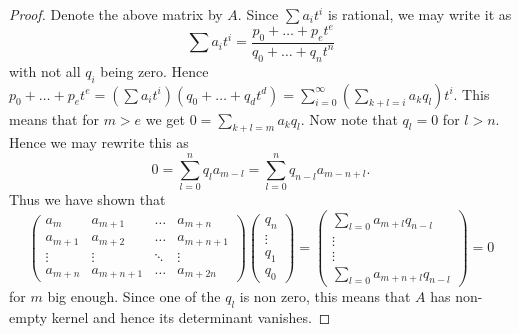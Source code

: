 \documentclass[11pt, a4paper, english, twoside]{article}
\theoremstyle{plain}
\theoremstyle{definition}
\begin{document}
\begin{proof}
    Denote the above matrix by $A$. Since $\sum a_it^i$ is rational, we may write it as
    \[
        \sum a_it^i = \frac{p_0 + \dots + p_et^e}{q_0 + \dots + q_n t^n}
    \]
    with not all $q_i$ being zero.
    Hence 
    $p_0 + \dots + p_et^e = \left(\sum a_it^i\right)\left(q_0 + \dots + q_d t^d\right) = \sum_{i=0}^{\infty} \left(\sum_{k+l=i} a_kq_l\right)t^i$.
    This means that for $m > e$ we get $0 = \sum_{k+l=m} a_kq_l$. Now note that $q_l = 0$ for $l > n$. Hence we may rewrite this as
    \[
        0 = \sum_{l = 0}^{n} q_la_{m-l} = \sum_{l=0}^n q_{n-l}a_{m-n+l}.
    \]
    Thus we have shown that
    \[
        \begin{pmatrix}
            a_m     & a_{m+1} & \dots & a_{m+n} \\
            a_{m+1} & a_{m+2} & \dots & a_{m+n+1} \\
            \vdots  & \vdots  & \ddots & \vdots \\
            a_{m+n} & a_{m+n+1} & \dots & a_{m+2n}
        \end{pmatrix}
        \begin{pmatrix}
            q_n \\ \vdots \\ q_1 \\ q_0
        \end{pmatrix}
        =
        \begin{pmatrix}
            \sum_{l=0} a_{m+l}q_{n-l} \\ \vdots \\ \vdots \\ \sum_{l=0} a_{m+n+l}q_{n-l}
        \end{pmatrix}
        = 0
    \]
    for $m$ big enough. Since one of the $q_l$ is non zero, this means that $A$ has non-empty kernel and hence its determinant vanishes.
\end{proof}
\end{document}
